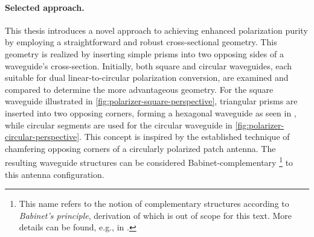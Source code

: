 \documentclass[11pt,a4paper,twoside,openany]{report}
\begin{document}
\paragraph{Selected approach.} This thesis introduces a novel approach to achieving enhanced polarization purity by employing a straightforward and robust cross-sectional geometry. This geometry is realized by inserting simple prisms into two opposing sides of a waveguide's cross-section. Initially, both square and circular waveguides, each suitable for dual linear-to-circular polarization conversion, are examined and compared to determine the more advantageous geometry. For the square waveguide illustrated in \cref{fig:polarizer-square-perspective}, triangular prisms are inserted into two opposing corners, forming a hexagonal waveguide as seen in \parencite{bhardwaj-volakis:hexagonal-waveguides-new-class-of-waveguides-for-mmwave-circularly-polarized-horns}, while circular segments are used for the circular waveguide in \cref{fig:polarizer-circular-perspective}. This concept is inspired by the established technique of chamfering opposing corners of a circularly polarized patch antenna. The resulting waveguide structures can be considered Babinet-complementary%
    \footnote{This name refers to the notion of complementary structures according to \emph{Babinet's principle}, derivation of which is out of scope for this text. More details can be found, e.g., in \parencite{born-wolf:principles-of-optics}.}
to this antenna configuration.
\end{document}

